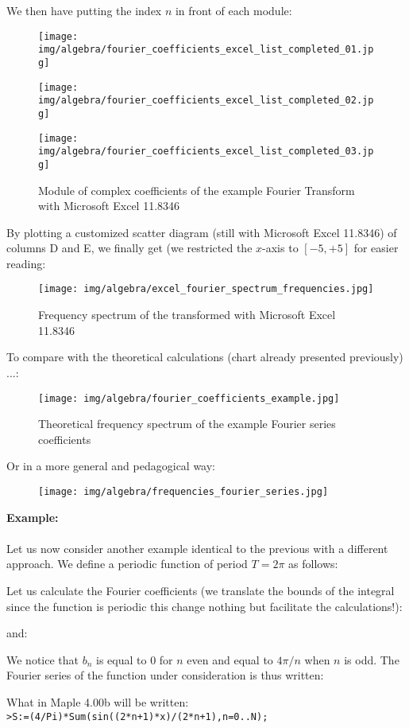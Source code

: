 	We then have putting the index $n$ in front of each module:
	\begin{figure}[H]
		\centering
		\texttt{[image: img/algebra/fourier\_coefficients\_excel\_list\_completed\_01.jpg]}
	\end{figure}
	\begin{figure}[H]
		\centering
		\texttt{[image: img/algebra/fourier\_coefficients\_excel\_list\_completed\_02.jpg]}
	\end{figure}
	\begin{figure}[H]
		\centering
		\texttt{[image: img/algebra/fourier\_coefficients\_excel\_list\_completed\_03.jpg]}
		\caption[]{Module of complex coefficients of the example Fourier Transform with Microsoft Excel 11.8346}
	\end{figure}
	By plotting a customized scatter diagram (still with  Microsoft Excel 11.8346) of columns D and E, we finally get (we restricted the $x$-axis to $[-5, +5]$ for easier reading:
	\begin{figure}[H]
		\centering
		\texttt{[image: img/algebra/excel\_fourier\_spectrum\_frequencies.jpg]}
		\caption[]{Frequency spectrum of the transformed with Microsoft Excel 11.8346}
	\end{figure}
	To compare with the theoretical calculations (chart already presented previously) ...:
	\begin{figure}[H]
		\centering
		\texttt{[image: img/algebra/fourier\_coefficients\_example.jpg]}
		\caption{Theoretical frequency spectrum of the example Fourier series coefficients}
	\end{figure}
	Or in a more general and pedagogical way:
	\begin{figure}[H]
		\centering
		\texttt{[image: img/algebra/frequencies\_fourier\_series.jpg]}
	\end{figure}
	\begin{tcolorbox}[colframe=black,colback=white,sharp corners]
	\textbf{{\Large {}}Example:}\\\\
	Let us now consider another example identical to the previous with a different approach. We define a periodic function of period $T=2\pi$ as follows:
	
	Let us calculate the Fourier coefficients (we translate the bounds of the integral since the function is periodic this change nothing but facilitate the calculations!):
	
	and:
	
	We notice that $b_n$ is equal to $0$ for $n$ even and equal to $4\pi/n$ when $n$ is odd.
	The Fourier series of the function under consideration is thus written:
	
	What in Maple 4.00b will be written:\\
	
	\texttt{>S:=(4/Pi)*Sum(sin((2*n+1)*x)/(2*n+1),n=0..N);}
	\end{tcolorbox}
	
